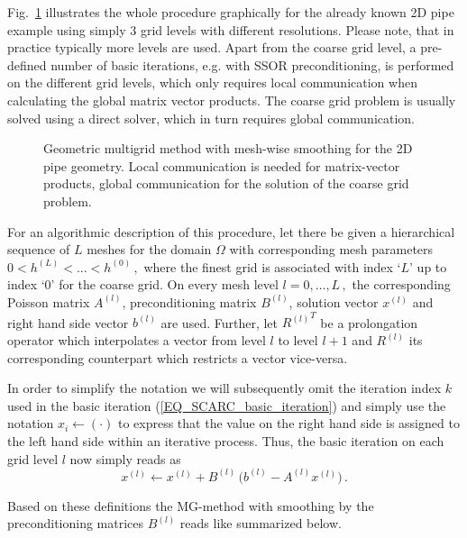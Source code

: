 Fig.~\ref{FIG_SCARC_mg_method} illustrates the whole procedure graphically
for the already known 2D pipe example using simply 3 grid levels with different resolutions. Please note, that in practice typically more levels are used. Apart from the coarse grid level, a pre-defined number of basic iterations, e.g. with SSOR preconditioning, is performed on the different grid levels, which only requires local communication when calculating the global matrix vector products. The coarse grid problem is usually solved using a direct solver, which in turn requires global communication.
\begin{figure}[ht]
\centering
\caption{Geometric multigrid method with mesh-wise smoothing for the 2D pipe geometry. Local communication is needed for matrix-vector products, global communication for the solution of the coarse grid problem. }
\label{FIG_SCARC_mg_method}
\end{figure}

For an algorithmic description of this procedure, 
let there be given a hierarchical sequence of $L$ meshes for the domain $\Omega$
with corresponding mesh parameters $0<h^{(L)}< \ldots < h^{(0)}\,,$
where the finest grid is associated with index `$L$' up to index `0' for the coarse grid. On every mesh level 
$l=0, \ldots,L\,,$ the
corresponding Poisson matrix $A^{(l)}$, preconditioning matrix $B^{(l)}$, solution vector $x^{(l)}$ and right hand side vector $b^{(l)}$ are
used.
Further, let ${R^{(l)}}^T$ be a prolongation operator which interpolates a vector from level $l$ to level $l+1$ and
$R^{(l)}$ its corresponding counterpart which restricts a vector vice-versa.

In order to simplify the notation we will subsequently omit the iteration index $k$ used in the basic iteration (\ref{EQ_SCARC_basic_iteration})
and simply use the notation $x_i \leftarrow (\cdot)$
to express that the value on the right hand side is assigned to the left hand side within an iterative process. Thus, the basic iteration on each grid level $l$ now simply reads as
\[ x^{(l)} \leftarrow x^{(l)} + B^{(l)}\, \big(b^{(l)} - A^{(l)} x^{(l)} \big)\,. \]

Based on these definitions the MG-method with smoothing by the preconditioning matrices $B^{(l)}$ reads like summarized below.

\newpage   %
